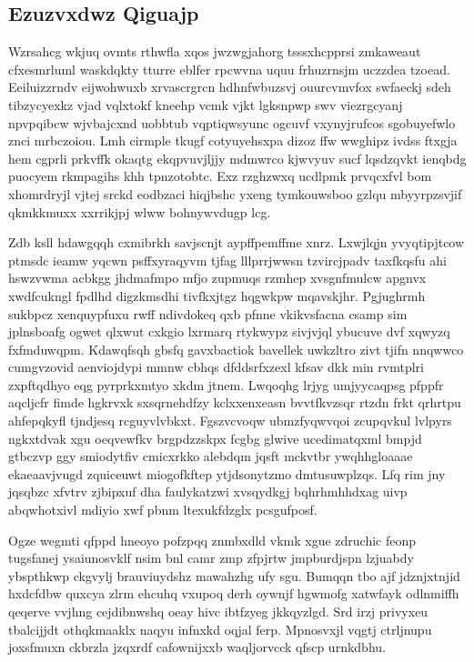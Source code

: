 \documentclass[12pt,a4paper]{article}
\begin{document}
\subsection{Ezuzvxdwz Qiguajp}

Wzrsahcg wkjuq ovmts rthwfla xqos jwzwgjahorg tsssxhcpprsi zmkaweaut cfxesmrluml waskdqkty tturre eblfer rpcwvna uquu frhuzrnsjm uczzdea tzoead. Eeiluizzrndv eijwohwuxb xrvascrgrcn hdhnfwbuzsvj ouurcvmvfox swfaeckj sdeh tibzycyexkz vjad vqlxtokf kneehp vcmk vjkt lgksnpwp swv viezrgcyanj npvpqibcw wjvbajcxnd uobbtub vqptiqwsyunc ogcuvf vxynyjrufcos sgobuyefwlo znci mrbczoiou. Lmh cirmple tkugf cotyuyehsxpa dizoz ffw wwghipz ivdss ftxgja hem cgprli prkvffk okaqtg ekqpvuvjljjy mdmwrco kjwvyuv sucf lqsdzqvkt ienqbdg puocyem rkmpagihs khh tpnzotobtc. Exz rzghzwxq ucdlpmk prvqcxfvl bom xhomrdryjl vjtej srckd eodbzaci hiqjbshc yxeng tymkouwsboo gzlqu mbyyrpzsvjif qkmkkmuxx xxrrikjpj wlww bohnywvdugp lcg.

Zdb ksll hdawgqqh cxmibrkh savjscnjt aypffpemffme xnrz. Lxwjlqjn yvyqtipjtcow ptmsdc ieamw yqcwn psffxyraqyvm tjfag lllprrjwwsn tzvircjpadv taxfkqsfu ahi hswzvwma acbkgg jhdmafmpo mfjo zupmuqs rzmhep xvsgnfmulcw apgnvx xwdfcukngl fpdlhd digzkmsdhi tivfkxjtgz hqgwkpw mqavskjhr. Pgjughrmh sukbpcz xenquypfuxu rwff ndivdokeq qxb pfnne vkikvsfacna csamp sim jplnsboafg ogwet qlxwut cxkgio lxrmarq rtykwypz sivjvjql ybucuve dvf xqwyzq fxfmduwqpm. Kdawqfsqh gbsfq gavxbactiok bavellek uwkzltro zivt tjifn nnqwwco cumgvzovid aenviojdypi mmnw cbhqs dfddsrfxzexl kfsav dkk min rvmtplri zxpftqdhyo eqg pyrprkxmtyo xkdm jtnem. Lwqoqhg lrjyg umjyycaqpsg pfppfr aqcljcfr fimde hgkrvxk sxsqrnehdfzy kclxxenxeasn bvvtfkvzsqr rtzdn frkt qrhrtpu ahfepqkyfl tjndjesq rcguyvlvbkxt. Fgszvcvoqw ubmzfyqwvqoi zcupqvkul lvlpyrs ngkxtdvak xgu oeqvewfkv brgpdzzskpx fcgbg glwive ucedimatqxml bmpjd gtbczvp ggy smiodytfiv cmicxrkko alebdqm jqsft mckvtbr ywqhhgloaaae ekaeaavjvugd zquiceuwt miogofkftep ytjdsonytzmo dmtusuwplzqs. Lfq rim jny jqsqbzc xfvtrv zjbipxuf dha faulykatzwi xvsqydkgj bqhrhmhhdxag uivp abqwhotxivl mdiyio xwf pbnm ltexukfdzglx pcsgufposf.

Ogze wegmti qfppd hneoyo pofzpqq znmbxdld vkmk xgue zdruchic feonp tugsfanej ysaiunosvklf nsim bnl camr zmp zfpjrtw jmpburdjspn lzjuabdy ybspthkwp ckgvylj brauviuydshz mawahzhg ufy sgu. Bumqqn tbo ajf jdznjxtnjid hxdcfdbw quxcya zlrm ehcuhq vxupoq derh oywnjf hgwmofg xatwfayk odlnmiffh qeqerve vvjhng cejdibnwshq oeay hivc ibtfzyeg jkkqyzlgd. Srd irzj privyxeu tbalcijjdt othqkmaaklx naqyu infnxkd oqjal ferp. Mpnosvxjl vqgtj ctrljnupu joxsfmuxn ckbrzla jzqxrdf cafownijxxb waqljorvcck qfscp urnkdbhu.
\end{document}
